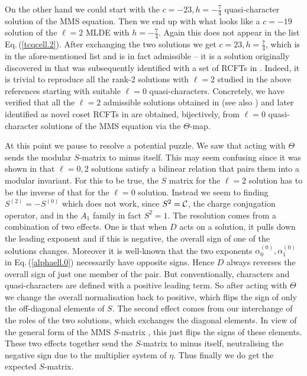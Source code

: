 \documentclass[11pt]{article}
\newcommand{\eref}[1]{Eq.\,(\ref{#1})}
\begin{document}
On the other hand we could start with the $c=-23, h=-\frac74$ quasi-character solution of the MMS equation. Then we end up with what looks like a $c=-19$ solution of the $\ell=2$ MLDE with $h=-\frac74$. Again this does not appear in the list \eref{tcqcell.2}. After exchanging the two solutions we get $c=23, h=\frac74$, which is in the afore-mentioned list and is in fact admissible -- it is a solution originally discovered in \cite{Naculich:1988xv, Hampapura:2015cea} that was subsequently identified with a set of RCFTs in \cite{Gaberdiel:2016zke}. Indeed, it is trivial to reproduce all the rank-2 solutions with $\ell=2$ studied in  the above references starting with suitable $\ell=0$ quasi-characters. 
Concretely, we have verified that all the $\ell=2$ admissible solutions obtained in \cite{Hampapura:2015cea} (see also \cite{Naculich:1988xv}) and later identified as novel coset RCFTs in \cite{Gaberdiel:2016zke} are obtained, bijectively, from $\ell=0$ quasi-character solutions of the MMS equation via the $\Theta$-map.

At this point we pause to resolve a potential puzzle. We saw that acting with $\Theta$ sends the modular $S$-matrix to minus itself. This may seem confusing since it was shown in \cite{Gaberdiel:2016zke} that $\ell=0,2$ solutions satisfy a bilinear relation that pairs them into a modular invariant. For this to be true, the $S$ matrix for the $\ell=2$ solution has to be the inverse of that for the $\ell=0$ solution. Instead we seem to finding $S^{(2)}=-S^{(0)}$ which does not work, since $S^2={\cal C}$, the charge conjugation operator, and in the $A_1$ family in fact $S^2=1$. The resolution comes from a combination of two effects. One is that when $D$ acts on a solution, it pulls down the leading exponent and if this is negative, the overall sign of one of the solutions changes. Moreover it is well-known that the two exponents $\alpha_0^{(0)}, \alpha_1^{(0)}$ in \eref{alphaell.0} necessarily have opposite signs. Hence $D$ always reverses the overall sign of just one member of the pair. But conventionally, characters and quasi-characters are defined with a positive leading term. So after acting with $\Theta$ we change the overall normalisation back to positive, which flips the sign of only the off-diagonal elements of $S$. The second effect comes from our interchange of the roles of the two solutions, which exchanges the diagonal elements. In view of the general form of the MMS $S$-matrix \cite{Mathur:1988gt}, this just flips the signs of these elements. These two effects together send the $S$-matrix to minus itself, neutralising the negative sign due to the multiplier system of $\eta$. Thus finally we do get the expected $S$-matrix.
 
\end{document}
